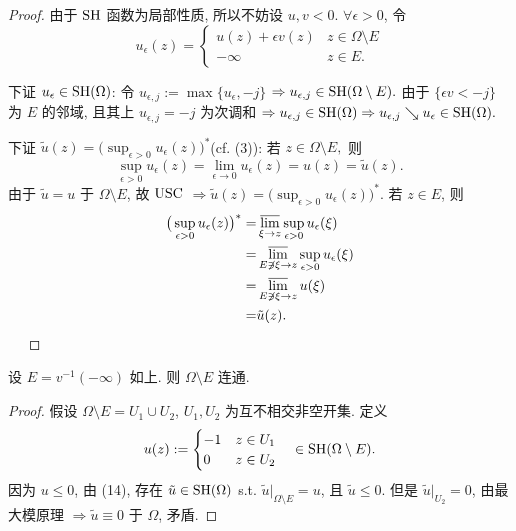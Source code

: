 \begin{proof}
  由于 $\operatorname{SH}$ 函数为局部性质, 所以不妨设 $u,v <0$.
  $\forall \epsilon >0$, 令 
  $$ u_{\epsilon }(z)= \begin{cases}
    u(z)+\epsilon v(z) &\text{} z \in \Omega \setminus E\\
    - \infty  &\text{} z \in E.
  \end{cases}  $$  

  下证 $u_{\epsilon } \in \operatorname{SH}(\Omega )$: 令 $u_{\epsilon ,j}:=\max\{u_{\epsilon },-j\}$ $\Rightarrow u_{\epsilon ,j} \in \operatorname{SH}(\Omega \setminus E).$
  由于 $\{\epsilon v <-j\}$ 为 $E$ 的邻域, 且其上 $u_{\epsilon ,j}=-j$ 为次调和 $\Rightarrow u_{\epsilon ,j} \in \operatorname{SH} (\Omega ) \Rightarrow u_{\epsilon ,j} \searrow u_{\epsilon } \in \operatorname{SH}(\Omega ).$       

  下证 $\tilde{u}(z) = \big( \sup_{\epsilon >0}u_{\epsilon }(z) \big)^{*}$(cf. (3)):   
  若 $z \in \Omega \setminus E, $ 则
  $$ \sup_{\epsilon >0}u_{\epsilon }(z)=\lim_{\epsilon \to 0}u_{\epsilon }(z)=u(z)=\tilde{u}(z) .$$ 
  由于 $\tilde{u}=u$ 于 $\Omega \setminus E$, 故 $\operatorname{USC}$ $\Rightarrow \tilde{u}(z) = \big( \sup_{\epsilon >0}u_{\epsilon }(z) \big)^{*}$.
  若 $z \in E$, 则 
  $$ \begin{aligned}
    \big( \sup_{\epsilon >0}u_{\epsilon }(z) \big)^{*}=& \varlimsup_{\xi \to z} \sup_{\epsilon >0}u_{\epsilon }(\xi )\\
    =& \varlimsup_{E \not\ni  \xi \to z} \sup_{\epsilon >0}u_{\epsilon }(\xi )\\
    =& \varlimsup_{E \not\ni  \xi \to z} u(\xi )\\
    =& \tilde{u}(z).
  \end{aligned}  $$     
  ~~
\end{proof}

\begin{corollary}
  设 $E=v^{-1}(-\infty )$ 如上. 则 $\Omega \setminus E$ 连通.  
\end{corollary}
\begin{proof}
  假设 $\Omega \setminus E=U_1 \cup U_2$, $U_1,U_2$ 为互不相交非空开集.
  定义 
  $$ u(z):= \begin{cases}
    -1 &\text{} z \in U_1\\
     0 &\text{} z \in U_2
  \end{cases} \quad \in \operatorname{SH}(\Omega \setminus E) .$$  
  因为 $u \leq 0$, 由 (14), 存在 $\tilde{u} \in \operatorname{SH}(\Omega )$ s.t. $\tilde{u}|_{\Omega \setminus E}=u$, 且 $\tilde{u} \leq 0$. 但是 $\tilde{u}|_{U_2}=0$, 由最大模原理 $\Rightarrow \tilde{u} \equiv 0$ 于 $\Omega $, 矛盾.       
\end{proof}


